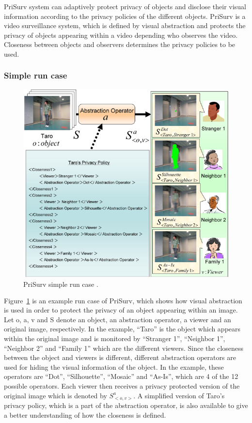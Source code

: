 \documentclass[conference]{IEEEtran}
\begin{document}
PriSurv system \cite{chinomi2008PriSurv} can adaptively protect privacy of objects and disclose their visual information according to the privacy policies of the different objects. PriSurv is a video surveillance system, which is defined by visual abstraction and protects the privacy of objects appearing within a video depending who observes the video. Closeness between objects and observers determines the privacy policies to be used. 


\subsubsection{Simple run case}

\begin{figure}[t]
\centerline{\includegraphics[width=.5\textwidth]{img//prisurv_simple_demo.png}}
\caption{PriSurv simple run case \cite{chinomi2008PriSurv}.}
\label{fig:prisurv}
\end{figure}

Figure~\ref{fig:prisurv} is an example run case of PriSurv, which shows how visual abstraction is used in order to protect the privacy of an object appearing within an image. Let o, a, v and S denote an object, an abstraction operator, a viewer and an original image, respectively. In the example, “Taro” is the object which appears within the original image and is monitored by “Stranger 1”, “Neighbor 1”, “Neighbor 2” and “Family 1” which are the different viewers. Since the closeness between the object and viewers is different, different abstraction operators are used for hiding the visual information of the object. In the example, these operators are “Dot”, “Silhouette”, “Mosaic” and “As-Is”, which are 4 of the 12 possible operators. Each viewer then receives a privacy protected version of the original image which is denoted by $S_{<o, v>}^a$. A simplified version of Taro’s privacy policy, which is a part of the abstraction operator, is also available to give a better understanding of how the closeness is defined. 
\end{document}
